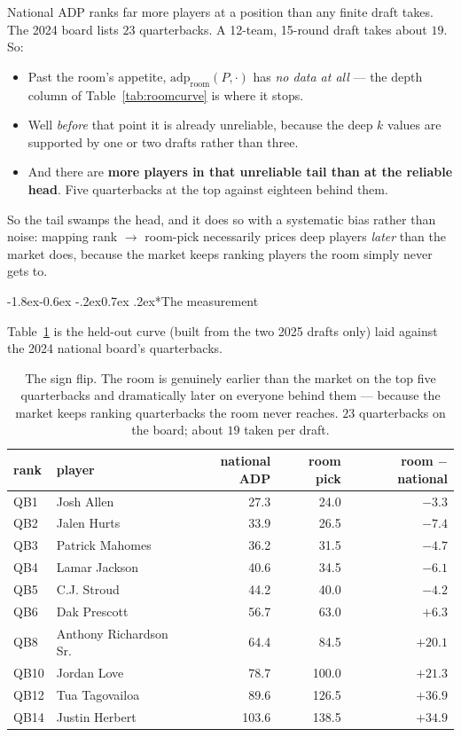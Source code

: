 \documentclass[10pt,a4paper]{article}
\makeatletter
\theoremstyle{plain}
\theoremstyle{definition}
\theoremstyle{remark}
\newcommand{\adp}{\mathrm{adp}}
\renewcommand\subsubsection{\@startsection{subsubsection}{3}{\z@}%
  {-1.8ex\@plus -0.6ex \@minus -.2ex}{0.7ex \@plus .2ex}{\normalfont\normalsize\bfseries}}
\makeatother
\begin{document}
National ADP ranks far more players at a position than any finite draft takes. The 2024
board lists $23$ quarterbacks. A 12-team, 15-round draft takes about $19$. So:

\begin{itemize}
\item Past the room's appetite, $\adp_{\text{room}}(P,\cdot)$ has \emph{no data at all}
--- the depth column of Table~\ref{tab:roomcurve} is where it stops.
\item Well \emph{before} that point it is already unreliable, because the deep $k$ values
are supported by one or two drafts rather than three.
\item And there are \textbf{more players in that unreliable tail than at the reliable
head}. Five quarterbacks at the top against eighteen behind them.
\end{itemize}

So the tail swamps the head, and it does so with a systematic bias rather than noise:
mapping rank $\to$ room-pick necessarily prices deep players \emph{later} than the market
does, because the market keeps ranking players the room simply never gets to.

\subsubsection*{The measurement}

Table~\ref{tab:qbwarp} is the held-out curve (built from the two 2025 drafts only) laid
against the 2024 national board's quarterbacks.

\begin{table}[htbp]
\centering
\small
\begin{tabular}{llrrr}
\toprule
rank & player & national ADP & room pick & room $-$ national \\
\midrule
QB1  & Josh Allen             & 27.3 & 24.0 & $-3.3$ \\
QB2  & Jalen Hurts            & 33.9 & 26.5 & $-7.4$ \\
QB3  & Patrick Mahomes        & 36.2 & 31.5 & $-4.7$ \\
QB4  & Lamar Jackson          & 40.6 & 34.5 & $-6.1$ \\
QB5  & C.J. Stroud            & 44.2 & 40.0 & $-4.2$ \\
\midrule
QB6  & Dak Prescott           & 56.7 & 63.0 & $+6.3$ \\
QB8  & Anthony Richardson Sr. & 64.4 & 84.5 & $+20.1$ \\
QB10 & Jordan Love            & 78.7 & 100.0 & $+21.3$ \\
QB12 & Tua Tagovailoa         & 89.6 & 126.5 & $+36.9$ \\
QB14 & Justin Herbert         & 103.6 & 138.5 & $+34.9$ \\
\bottomrule
\end{tabular}
\caption{The sign flip. The room is genuinely earlier than the market on the top five
quarterbacks and dramatically later on everyone behind them --- because the market keeps
ranking quarterbacks the room never reaches. $23$ quarterbacks on the board; about $19$
taken per draft.}
\label{tab:qbwarp}
\end{table}
\end{document}

